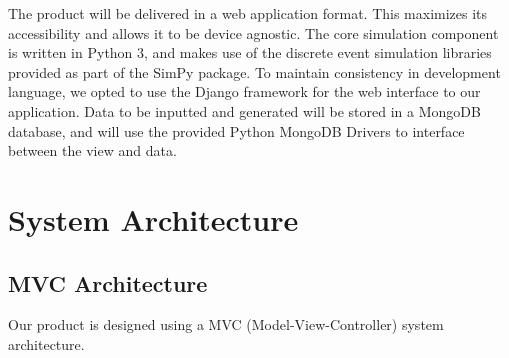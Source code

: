\documentclass[12pt]{article}
\begin{document}
The product will be delivered in a web application format. This maximizes its accessibility and allows it to be device agnostic. The core simulation component is written in Python 3, and makes use of the discrete event simulation libraries provided as part of the SimPy package. To maintain consistency in development language, we opted to use the Django framework for the web interface to our application. Data to be inputted and generated will be stored in a MongoDB database, and will use the provided Python MongoDB Drivers to interface between the view and data.

\section{System Architecture}
\subsection{MVC Architecture}
Our product is designed using a MVC (Model-View-Controller) system architecture.
\end{document}
